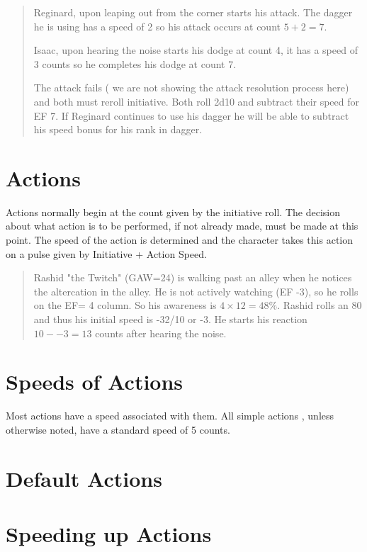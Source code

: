 \begin{quote}
Reginard, upon leaping out from the corner starts his attack. The 
dagger he is using has a speed of 2 so his attack occurs at count \( 
5 + 2 = 7 \). 

Isaac, upon hearing the noise starts his dodge at count 4, it has a
speed of 3 counts so he completes his dodge at count 7. 

The attack fails ( we are not showing the attack resolution process 
here) and both must reroll initiative. Both roll 2d10 and subtract 
their speed for EF 7. If Reginard continues to use his dagger he will 
be able to subtract his speed bonus for his rank in dagger. 

\end{quote}
\section{Actions}

Actions normally begin at the count given by the initiative roll. The 
decision about what action is to be performed, if not already made,  
must be made at this point. The speed of the action is determined and 
the character takes this action on a pulse given by Initiative +
Action Speed.  

\begin{quote}
Rashid "the Twitch" (GAW=24) is walking past an alley when he notices the 
altercation in the alley. He is not actively watching (EF -3), so he 
rolls on the EF= 4 column. So his awareness is \( 4 \times 12 = 48\% 
\).  Rashid rolls an 80 and thus his initial speed is -32/10 or -3. 
He starts his reaction \( 10 - -3 = 13 \) counts after hearing the 
noise. 
\end{quote}

\section{Speeds of Actions}

Most actions have a speed associated with them. All simple actions 
, unless otherwise noted, have a standard speed of 5 counts. 
 


\section{Default Actions}\label{sec:DefaultActions}

\section{Speeding up Actions}

